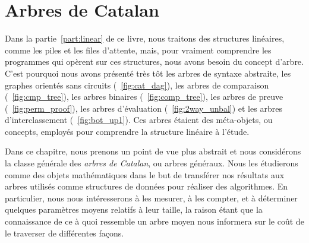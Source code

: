 \chapter{Arbres de Catalan}
\label{chap:Catalan}

Dans la partie~\ref{part:linear} de ce livre, nous traitons des
structures linéaires, comme les piles et les files d'attente, mais,
pour vraiment comprendre les programmes qui opèrent sur ces
structures, nous avons besoin du concept d'arbre. C'est pourquoi nous
avons présenté très tôt les arbres de syntaxe
abstraite, les graphes
orientés sans circuits (\fig~\vref{fig:cat_dag}), les arbres de
comparaison (\fig~\vref{fig:cmp_tree}), les arbres binaires
(\fig~\vref{fig:comp_tree}), les arbres de preuve
(\fig~\vref{fig:perm_proof}), les arbres d'évaluation
(\fig~\vref{fig:2way_unbal}) et les arbres d'interclassement
(\fig~\vref{fig:bot_up1}). Ces arbres étaient des méta-objets, ou
concepts, employés pour comprendre la structure linéaire à l'étude.

Dans ce chapitre, nous prenons un point de vue plus abstrait et nous
considérons la classe générale des \emph{arbres de Catalan}, ou arbres
généraux. Nous les étudierons comme des objets mathématiques dans le
but de transférer nos résultats aux arbres utilisés comme structures
de données pour réaliser des algorithmes. En particulier, nous nous
intéresserons à les mesurer, à les compter, et à déterminer quelques
paramètres moyens relatifs à leur taille, la raison étant que la
connaissance de ce à quoi ressemble un arbre moyen nous informera sur
le coût de le traverser de différentes façons.

